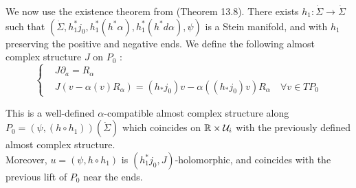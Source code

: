 \documentclass[../main.tex]{subfiles}
\begin{document}
We now use the existence theorem from \cite{cieliebak_stein_2012} (Theorem 13.8). There exists $h_1:\dot \Sigma \rightarrow \dot\Sigma$ such that $(\dot\Sigma,h_1^*j_0,h_1^*(h^*\alpha),h_1^*(h^*d\alpha),\psi)$ is a Stein manifold, and with $h_1$ preserving the positive and negative ends. We define the following almost complex structure $J$ on $P_0$ : 
$$\left\{
    \begin{array}{ll}
        & J\partial_a = R_\alpha \\
        & J(v - \alpha(v)R_\alpha) = (h_*j_0)v - \alpha((h_*j_0)v)R_\alpha \quad \forall v \in TP_0
    \end{array}
\right.$$

\begin{lemma}{\text{  }}

\noindent This is a well-defined $\alpha$-compatible almost complex structure along $P_0 = (\psi,(h\circ h_1))(\dot\Sigma)$ which coincides on $\mathbb{R}\times \mathcal{U}_i$ with the previously defined almost complex structure.\\ Moreover, $u = (\psi,h\circ h_1)$ is $(h_1^*j_0,J)$-holomorphic, and coincides with the previous lift of $P_0$ near the ends. 

\end{lemma}
\end{document}
